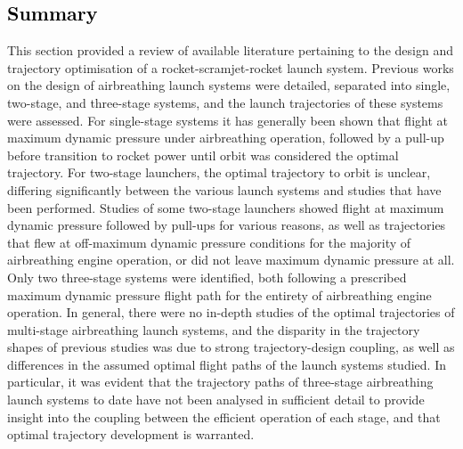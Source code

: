       \textcolor{black}{
      \section{Summary}
    }
\noindent
This section provided a review of available literature pertaining to the design and trajectory optimisation of a rocket-scramjet-rocket launch system.    
       Previous works on the design of airbreathing launch systems were detailed, separated into single, two-stage, and three-stage systems, and the launch trajectories of these systems were assessed. For single-stage systems it has generally been shown that flight at maximum dynamic pressure under airbreathing operation, followed by a pull-up before transition to rocket power until orbit was considered the optimal trajectory. For two-stage launchers, the optimal trajectory to orbit is unclear, differing significantly between the various launch systems and studies that have been performed. Studies of some two-stage launchers showed flight at maximum dynamic pressure followed by pull-ups for various reasons, as well as trajectories that flew at off-maximum dynamic pressure conditions for the majority of airbreathing engine operation, or did not leave maximum dynamic pressure at all. Only two three-stage systems were identified, both following a prescribed maximum dynamic pressure flight path for the entirety of airbreathing engine operation. In general, there were no in-depth studies of the optimal trajectories of multi-stage airbreathing launch systems, and the disparity in the trajectory shapes of previous studies was due to strong trajectory-design coupling, as well as differences in the assumed optimal flight paths of the launch systems studied. In particular, it was evident that the trajectory paths of three-stage airbreathing launch systems to date have not been analysed in sufficient detail to provide insight into the coupling between the efficient operation of each stage, and that optimal trajectory development is warranted. 
       
